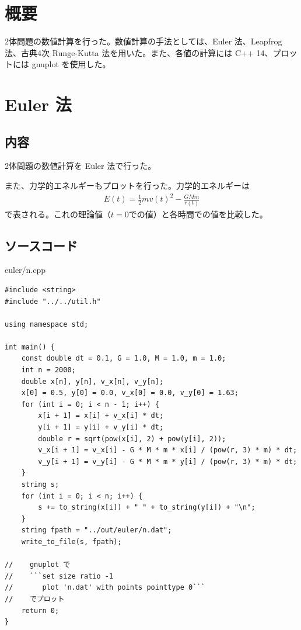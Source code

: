 \documentclass[a4paper,twoside]{jarticle}
\begin{document}

\maketitle

\section{概要}
2体問題の数値計算を行った。数値計算の手法としては、Euler 法、Leapfrog 法、古典4次 Runge-Kutta 法を用いた。また、各値の計算には C++ 14、プロットには gnuplot を使用した。

\section{Euler 法}\label{s-euler}

\subsection{内容}
2体問題の数値計算を Euler 法で行った。

また、力学的エネルギーもプロットを行った。力学的エネルギーは
\begin{align}
  E(t)=\frac{1}{2}mv(t)^2-\frac{GMm}{r(t)}
\end{align}
で表される。これの理論値（$t=0$での値）と各時間での値を比較した。

\subsection{ソースコード}
euler/n.cpp
\begin{lstlisting}[]
#include <string>
#include "../../util.h"

using namespace std;

int main() {
    const double dt = 0.1, G = 1.0, M = 1.0, m = 1.0;
    int n = 2000;
    double x[n], y[n], v_x[n], v_y[n];
    x[0] = 0.5, y[0] = 0.0, v_x[0] = 0.0, v_y[0] = 1.63;
    for (int i = 0; i < n - 1; i++) {
        x[i + 1] = x[i] + v_x[i] * dt;
        y[i + 1] = y[i] + v_y[i] * dt;
        double r = sqrt(pow(x[i], 2) + pow(y[i], 2));
        v_x[i + 1] = v_x[i] - G * M * m * x[i] / (pow(r, 3) * m) * dt;
        v_y[i + 1] = v_y[i] - G * M * m * y[i] / (pow(r, 3) * m) * dt;
    }
    string s;
    for (int i = 0; i < n; i++) {
        s += to_string(x[i]) + " " + to_string(y[i]) + "\n";
    }
    string fpath = "../out/euler/n.dat";
    write_to_file(s, fpath);

//    gnuplot で
//    ```set size ratio -1
//       plot 'n.dat' with points pointtype 0```
//    でプロット
    return 0;
}
\end{lstlisting}
\end{document}
